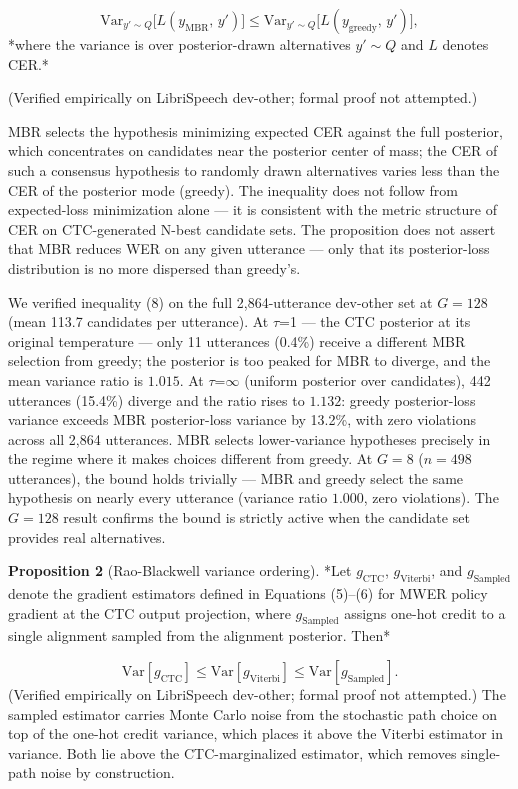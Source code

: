\begin{equation*}
\text{Var}_{y' \sim Q}\bigl[L(y_\text{MBR},\, y')\bigr] \leq \text{Var}_{y' \sim Q}\bigl[L(y_\text{greedy},\, y')\bigr], \tag{8}
\end{equation*}
*where the variance is over posterior-drawn alternatives $y' \sim Q$ and $L$ denotes CER.*

(Verified empirically on LibriSpeech dev-other; formal proof not attempted.)

MBR selects the hypothesis minimizing expected CER against the full posterior, which concentrates on candidates near the posterior center of mass; the CER of such a consensus hypothesis to randomly drawn alternatives varies less than the CER of the posterior mode (greedy). The inequality does not follow from expected-loss minimization alone — it is consistent with the metric structure of CER on CTC-generated N-best candidate sets. The proposition does not assert that MBR reduces WER on any given utterance — only that its posterior-loss distribution is no more dispersed than greedy's.

We verified inequality (8) on the full 2{,}864-utterance dev-other set at $G=128$ (mean 113.7 candidates per utterance). At $\tau$=1 — the CTC posterior at its original temperature — only 11 utterances (0.4\%) receive a different MBR selection from greedy; the posterior is too peaked for MBR to diverge, and the mean variance ratio is $1.015$. At $\tau$=$\infty$ (uniform posterior over candidates), 442 utterances (15.4\%) diverge and the ratio rises to $1.132$: greedy posterior-loss variance exceeds MBR posterior-loss variance by 13.2\%, with zero violations across all 2{,}864 utterances. MBR selects lower-variance hypotheses precisely in the regime where it makes choices different from greedy. At $G=8$ ($n = 498$ utterances), the bound holds trivially — MBR and greedy select the same hypothesis on nearly every utterance (variance ratio $1.000$, zero violations). The $G=128$ result confirms the bound is strictly active when the candidate set provides real alternatives.

\textbf{Proposition 2} (Rao-Blackwell variance ordering). *Let $g_\text{CTC}$, $g_\text{Viterbi}$, and $g_\text{Sampled}$ denote the gradient estimators defined in Equations (5)–(6) for MWER policy gradient at the CTC output projection, where $g_\text{Sampled}$ assigns one-hot credit to a single alignment sampled from the alignment posterior. Then*

\begin{equation*}
\text{Var}[g_\text{CTC}] \leq \text{Var}[g_\text{Viterbi}] \leq \text{Var}[g_\text{Sampled}]. \tag{9}
\end{equation*}
(Verified empirically on LibriSpeech dev-other; formal proof not attempted.)
The sampled estimator carries Monte Carlo noise from the stochastic path choice on top of the one-hot credit variance, which places it above the Viterbi estimator in variance. Both lie above the CTC-marginalized estimator, which removes single-path noise by construction.

